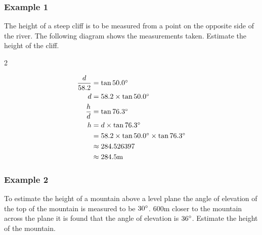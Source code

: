 \subsubsection{Example 1}
The height of a steep cliff is to be measured from a point on the opposite side of the river.  The
following diagram shows the measurements taken. Estimate the height of the cliff. 


\columnsep =30pt
\begin {multicols}{2}
 

   
\setlength\fboxrule{0in}\setlength\fboxsep{0.2in}



\begin{align*}\frac{d}{58.2} &  =  \tan  50.0 \mbox{{\ensuremath{{}^\circ}}} \\
d &  =  58.2 \times \tan  50.0 \mbox{{\ensuremath{{}^\circ}}} \\
\frac{h}{d} &  =  \tan  76.3 \mbox{{\ensuremath{{}^\circ}}} \\
h &  =  d \times \tan  76.3 \mbox{{\ensuremath{{}^\circ}}} \\
 &  =  58.2 \times \tan  50.0 \mbox{{\ensuremath{{}^\circ}}} \times \tan  76.3 \mbox{{\ensuremath{{}^\circ}}} \\
 &  \approx   284.526397 \\
 &  \approx   284.5 \mbox{m}\end{align*}


\end {multicols}


\subsubsection{Example 2}
To estimate the height of a mountain above a level plane the angle of elevation of the top of the mountain is measured to be $30 \mbox{{\ensuremath{{}^\circ}}}$. $600 \mbox{m}$ closer to the mountain across the plane it is found that the angle of elevation
is $36 \mbox{{\ensuremath{{}^\circ}}}$. Estimate the height of the mountain. 

   
\setlength\fboxrule{0in}\setlength\fboxsep{0.2in}



